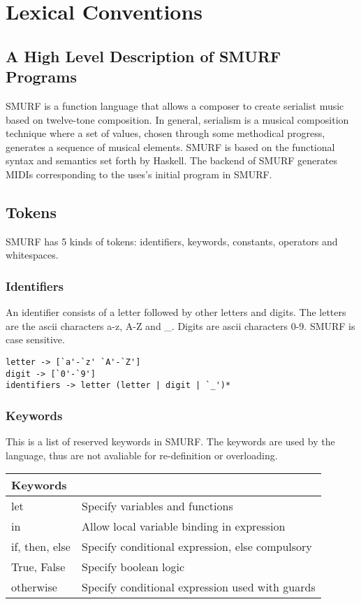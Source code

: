 \section{Lexical Conventions}
\subsection{A High Level Description of SMURF Programs}
SMURF is a function language that allows a composer to create serialist music
based on twelve-tone composition. In general, serialism is a musical composition
technique where a set of values, chosen through some methodical progress,
          generates a sequence of musical elements. SMURF is based on the
          functional syntax and semantics set forth by Haskell. The backend of
          SMURF generates MIDIs corresponding to the uses's initial program in
          SMURF. 

\subsection{Tokens}
SMURF has 5 kinds of tokens: identifiers, keywords, constants, operators and whitespaces.

\subsubsection{Identifiers}
\label{sec:identifiers}
An identifier consists of a letter followed by other letters and
digits. The letters are the ascii characters a-z, A-Z and \_. Digits are ascii
characters 0-9. SMURF is case sensitive.
\begin{verbatim}
letter -> [`a'-`z' `A'-`Z']
digit -> [`0'-`9']
identifiers -> letter (letter | digit | `_')*
\end{verbatim}

\subsubsection{Keywords}
This is a list of reserved keywords in SMURF. The keywords are used by the
language, thus are not avaliable for re-definition or overloading.
\begin{table} [H]
	\centering
    \begin{tabular}{ll}
    \hline\hline
    Keywords & \\ 
    \hline\hline
      let & Specify variables and functions  \\ \hline
      in & Allow local variable binding in expression \\ \hline
      if, then, else & Specify conditional expression, else compulsory  \\ \hline
      True, False & Specify boolean logic \\ \hline
      otherwise & Specify conditional expression used with guards \\ \hline 
    \end{tabular}
\end{table}


